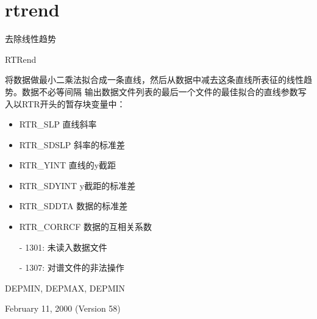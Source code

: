 \section{rtrend}
\label{cmd:rtrend}

去除线性趋势

RTRend

将数据做最小二乘法拟合成一条直线，然后从数据中减去这条直线所表征的线性趋势。数据不必等间隔
输出数据文件列表的最后一个文件的最佳拟合的直线参数写入以RTR开头的暂存块变量中：
\begin{itemize}
\item RTR\_SLP 直线斜率
\item RTR\_SDSLP 斜率的标准差
\item RTR\_YINT 直线的y截距
\item RTR\_SDYINT y截距的标准差
\item RTR\_SDDTA 数据的标准差
\item RTR\_CORRCF 数据的互相关系数
\end{itemize}

\begin{itemize}
\item[-]1301: 未读入数据文件
\item[-]1307: 对谱文件的非法操作
\end{itemize}

DEPMIN, DEPMAX, DEPMIN

February 11, 2000 (Version 58)
